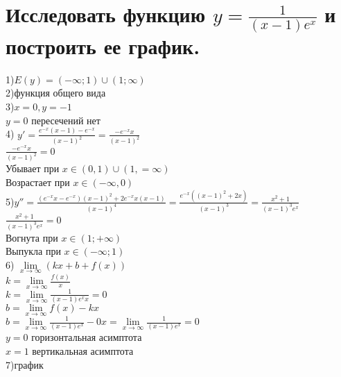 \documentclass[a4paper]{article}
\begin{document}
        \section{Исследовать функцию $y=\frac{1}{(x-1)e^x}$ и построить ее график.}
        1)$E(y)=(-\infty;1)\cup(1;\infty)$\\
        2)функция общего вида\\
        3)$x=0, y=-1$\\
        $y=0$ пересечений нет\\
        4)
        $y'=\frac{e^{-x}(x-1)-e^{-x}}{(x-1)^2}
        =\frac{-e^{-x}x}{(x-1)^2}$\\
        $\frac{-e^{-x}x}{(x-1)^2}=0$\\
        Убывает при $x \in(0,1)\cup(1,=\infty)$\\
        Возрастает при $x \in(-\infty,0)$\\
        5)$y''=\frac{(e^{-x}x-e^{-x})(x-1)^2+2e^{-x}x(x-1)}{(x-1)^4}
        =\frac{ e^{-x}((x-1)^2+2x)}{(x-1)^3}=
        \frac{x^2+1}{(x-1)^3e^x}$\\
        $\frac{x^2+1}{(x-1)^3e^x}=0$\\
        Вогнута при $x \in (1;+\infty)$\\
        Выпукла при $x \in (-\infty;1)$\\
        6)
        $\lim\limits_{x \to \infty} (kx+b+f(x))$\\
        $k=\lim\limits_{x \to \infty} \frac{f(x)}{x}$\\
        $k=\lim\limits_{x \to \infty} \frac{1}{(x-1)e^xx}=0$\\
        $b=\lim\limits_{x \to \infty} f(x)-kx$\\
        $b=\lim\limits_{x \to \infty} \frac{1}{(x-1)e^x}-0x
        =\lim\limits_{x \to \infty} \frac{1}{(x-1)e^x}=0$\\
        $y=0$ горизонтальная асимптота\\
        $x=1$ вертикальная асимптота\\
        7)график\\
\end{document}
